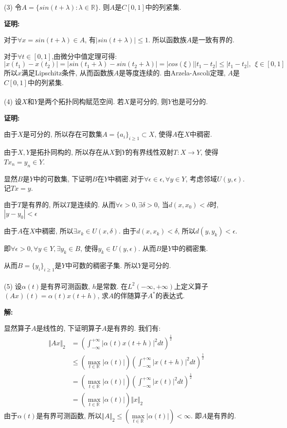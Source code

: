 \documentclass{article}
\begin{document}
(3) 令$A = \{ sin(t+\lambda): \lambda \in \mathbb{R} \}$. 则$A$是$C[0,1]$中的列紧集. 

\textbf{证明:}

对于$\forall x=sin(t+\lambda) \in A$, 有$|sin(t+\lambda)| \leq 1$. 所以函数族$A$是一致有界的.

对于$\forall t \in [0,1]$,由微分中值定理可得:
$$ |x(t_1) - x(t_2)| = |sin(t_1+\lambda) - sin(t_2+\lambda)| = |cos(\xi)||t_1 - t_2| \leq |t_1 - t_2|, \ \ \xi \in [0,1] $$ 
所以$x$满足Lipschitz条件, 从而函数族$A$是等度连续的. 由Arzela-Ascoli定理, $A$是$C[0,1]$中的列紧集. \\  \\



(4) 设$X$和$Y$是两个拓扑同构赋范空间. 若$X$是可分的, 则$Y$也是可分的. 

\textbf{证明:}

由于$X$是可分的, 所以存在可数集$ A = \{a_i \}_{i \geq 1} \subset X$, 使得$A$在$X$中稠密.

由于$X, Y$是拓扑同构的, 所以存在从$X$到$Y$的有界线性双射$T: X \rightarrow Y$, 使得$Tx_n = y_n \in Y$.

显然$B$是$Y$中的可数集, 下证明$B$在$Y$中稠密.对于$\forall \epsilon \in \epsilon, \forall y \in Y$, 考虑邻域$U(y, \epsilon)$. 记$Tx = y$.

由于$T$是有界的, 所以$T$是连续的. 从而$\forall \epsilon >0, \exists \delta >0$, 当$d(x, x_0) < \delta$时, $|y-y_0| < \epsilon $

由于$A$在$X$中稠密, 所以$\exists x_k \in U(x, \delta)$. 由于$d(x, x_k) < \delta$, 所以$d(y,y_k) < \epsilon$.

即$\forall \epsilon >0, \forall y \in Y, \exists y_k \in B $, 使得$ y_k \in U(y, \epsilon)$. 从而$B$是$Y$中的稠密集. 

从而$ B= \{y_i \}_{i \geq 1}$是$Y$中可数的稠密子集. 所以$Y$是可分的. \\  \\

 

(5) 设$\alpha(t)$是有界可测函数, $h$是常数. 在$L^2(-\infty, +\infty)$上定义算子$(Ax)(t) = \alpha(t)x(t+h)$, 求$A$的伴随算子$A^*$的表达式.    

\textbf{解:}

显然算子$A$是线性的, 下证明算子$A$是有界的. 我们有:
\begin{align*}
\Vert Ax \Vert_2 &= (\int_{-\infty}^{+\infty} |\alpha(t)x(t+h)|^2dt)^{\frac{1}{2}} \\
                 &\leq (\max\limits_{t\in \mathbb{R}}|\alpha(t)|) (\int_{-\infty}^{+\infty} |x(t+h)|^2dt)^{\frac{1}{2}} \\
                 &= (\max\limits_{t \in \mathbb{R}}|\alpha(t)|) (\int_{-\infty}^{+\infty} |x(t)|^2dt)^{\frac{1}{2}} \\
                 &= (\max\limits_{t \in \mathbb{R}}|\alpha(t)|) \Vert x \Vert_2 
\end{align*}
由于$\alpha(t)$是有界可测函数, 所以$\Vert A \Vert_2 \leq (\max\limits_{t \in \mathbb{R}}|\alpha(t)|) < \infty$. 即$A$是有界的. 
\end{document}
